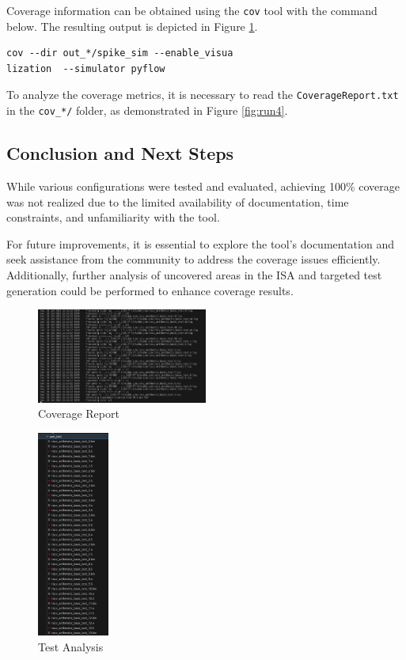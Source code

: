 Coverage information can be obtained using the \texttt{cov} tool with the command below. The resulting output is depicted in Figure \ref{fig:run3}.

\begin{verbatim}
cov --dir out_*/spike_sim --enable_visua
lization  --simulator pyflow
\end{verbatim}

To analyze the coverage metrics, it is necessary to read the \texttt{CoverageReport.txt} in the \texttt{cov\_*/} folder, as demonstrated in Figure \ref{fig:run4}.

\subsection{Conclusion and Next Steps}
While various configurations were tested and evaluated, achieving 100\% coverage was not realized due to the limited availability of documentation, time constraints, and unfamiliarity with the tool.

For future improvements, it is essential to explore the tool's documentation and seek assistance from the community to address the coverage issues efficiently. Additionally, further analysis of uncovered areas in the ISA and targeted test generation could be performed to enhance coverage results.

\begin{figure}[h]
  \centering
  \includegraphics[width=0.5\textwidth]{./c3l2_img/run3.png}
  \caption{Coverage Report}
  \label{fig:run3}
\end{figure}

\begin{figure}[h]
  \centering
  \includegraphics[width=0.21\textwidth]{./c3l2_img/run2.png}
  \caption{Test Analysis}
  \label{fig:run2}
\end{figure}


